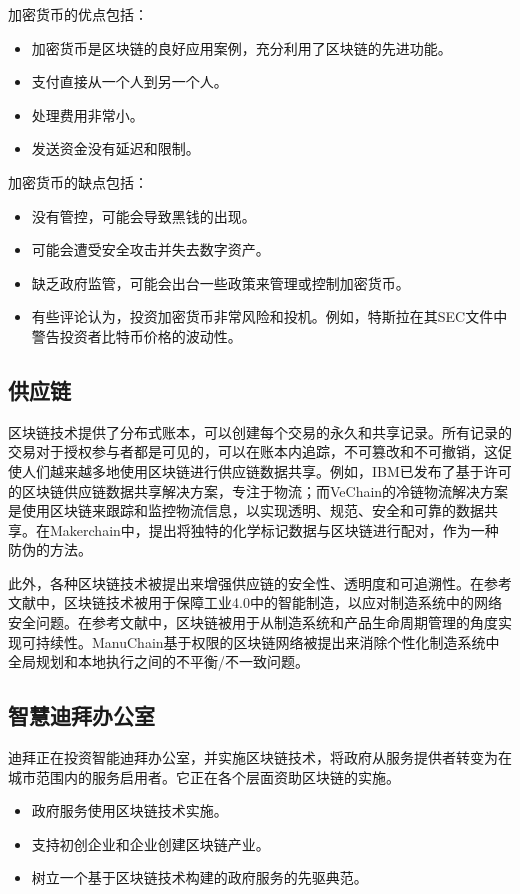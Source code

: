 \begin{translation}
加密货币的优点包括：
\begin{itemize}
    \item 加密货币是区块链的良好应用案例，充分利用了区块链的先进功能。
    \item 支付直接从一个人到另一个人。
    \item 处理费用非常小。
    \item 发送资金没有延迟和限制。
\end{itemize}

加密货币的缺点包括：
\begin{itemize}
    \item 没有管控，可能会导致黑钱的出现。
    \item 可能会遭受安全攻击并失去数字资产。
    \item 缺乏政府监管，可能会出台一些政策来管理或控制加密货币。
    \item 有些评论认为，投资加密货币非常风险和投机。例如，特斯拉在其SEC文件中警告投资者比特币价格的波动性\cite{art49}。
\end{itemize}

\subsection{供应链}

区块链技术提供了分布式账本，可以创建每个交易的永久和共享记录。所有记录的交易对于授权参与者都是可见的，可以在账本内追踪，不可篡改和不可撤销，这促使人们越来越多地使用区块链进行供应链数据共享。例如，IBM已发布了基于许可的区块链供应链数据共享解决方案，专注于物流\cite{art3}；而VeChain的冷链物流解决方案是使用区块链来跟踪和监控物流信息，以实现透明、规范、安全和可靠的数据共享\cite{art4}。在Makerchain\cite{art50}中，提出将独特的化学标记数据与区块链进行配对，作为一种防伪的方法。

此外，各种区块链技术被提出来增强供应链的安全性、透明度和可追溯性。在参考文献\cite{art51}中，区块链技术被用于保障工业4.0中的智能制造，以应对制造系统中的网络安全问题。在参考文献\cite{art52}中，区块链被用于从制造系统和产品生命周期管理的角度实现可持续性。ManuChain\cite{art53}基于权限的区块链网络被提出来消除个性化制造系统中全局规划和本地执行之间的不平衡/不一致问题。

\subsection{智慧迪拜办公室}

迪拜正在投资智能迪拜办公室，并实施区块链技术，将政府从服务提供者转变为在城市范围内的服务启用者。它正在各个层面资助区块链的实施。
\begin{itemize}
    \item 政府服务使用区块链技术实施。
    \item 支持初创企业和企业创建区块链产业。
    \item 树立一个基于区块链技术构建的政府服务的先驱典范。
\end{itemize}


\end{translation}
